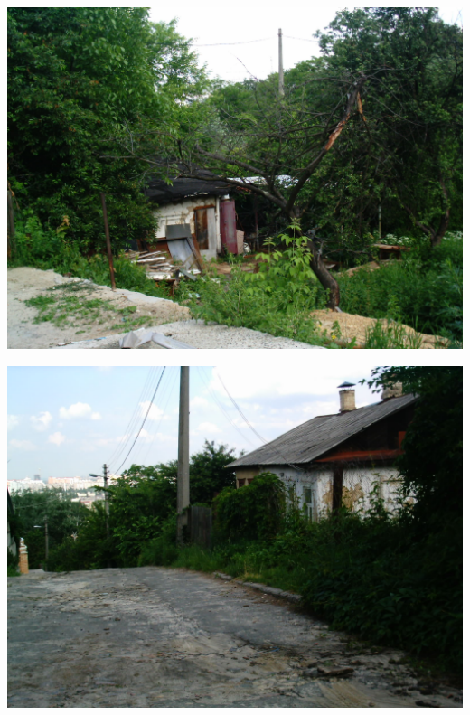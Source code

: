 \begin{center}
\includegraphics[width=\linewidth]{chast-kirvys/svetosl/shishk-imag0030.jpg}
\end{center}
\vspace*{\fill}

\newpage
\vspace*{\fill}
\begin{center}
\includegraphics[width=\linewidth]{chast-kirvys/svetosl/shishk-imag0035.jpg}
\end{center}

